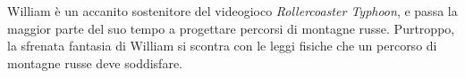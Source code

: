 \usepackage{xcolor}
\usepackage{afterpage}
\usepackage{pifont,mdframed}
\usepackage[bottom]{footmisc}

\makeatletter
\gdef\this@inputfilename{input.txt}
\gdef\this@outputfilename{output.txt}
\makeatother

\newcommand{\inputfile}{\texttt{input.txt}}
\newcommand{\outputfile}{\texttt{output.txt}}

\newenvironment{warning}
  {\par\begin{mdframed}[linewidth=2pt,linecolor=gray]%
    \begin{list}{}{\leftmargin=1cm
                   \labelwidth=\leftmargin}\item[\Large\ding{43}]}
  {\end{list}\end{mdframed}\par}

	William \`e un accanito sostenitore del videogioco \emph{Rollercoaster Typhoon}, e passa la maggior parte del suo tempo a progettare percorsi di montagne russe. Purtroppo, la sfrenata fantasia di William si scontra con le leggi fisiche che un percorso di montagne russe deve soddisfare.

